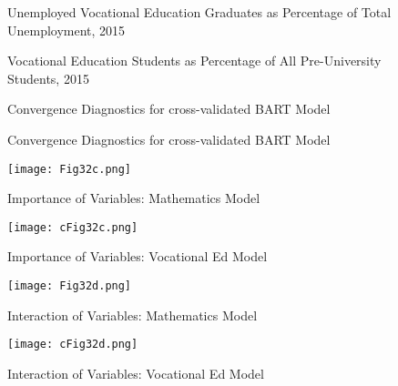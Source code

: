 \documentclass[alpha-refs,fleqn]{wiley-article_p2}
\begin{document}
\newpage

\begin{figure}[htbp!]
\begin{subfigure}[Panel A. Unemployed Workforce]{
\texttt{[image: m31a.png]}}
\end{subfigure}
\caption{Unemployed Vocational Education Graduates as Percentage of Total Unemployment, 2015}
\begin{subfigure}[Panel B. Student Population]{
\texttt{[image: m31b.png]}}
\end{subfigure}
\caption{Vocational Education Students as Percentage of All Pre-University Students, 2015}
\end{figure}


\newpage


\begin{figure}[htbp!]
\begin{subfigure}[Panel A. BART Model: Mathematics Achievement]{
\texttt{[image: Fig32b.png]}}
\end{subfigure}
\caption{Convergence Diagnostics for cross-validated BART Model} 
\begin{subfigure}[Panel B. BART Model: Vocational School Choice]{
\texttt{[image: cFig32b.png]}}
\end{subfigure}
\caption{Convergence Diagnostics for cross-validated BART Model}
\end{figure}

\newpage


\begin{figure}[htbp!]
\texttt{[image: Fig32c.png]}
\caption{Importance of Variables: Mathematics Model} 
\end{figure}

\begin{figure}[htbp!]
\texttt{[image: cFig32c.png]}
\caption{Importance of Variables: Vocational Ed Model} 
\end{figure}

\begin{figure}[htbp!]
\texttt{[image: Fig32d.png]}
\caption{Interaction of Variables: Mathematics Model} 
\end{figure}

\begin{figure}[htbp!]
\texttt{[image: cFig32d.png]}
\caption{Interaction of Variables: Vocational Ed Model} 
\end{figure}
\end{document}
